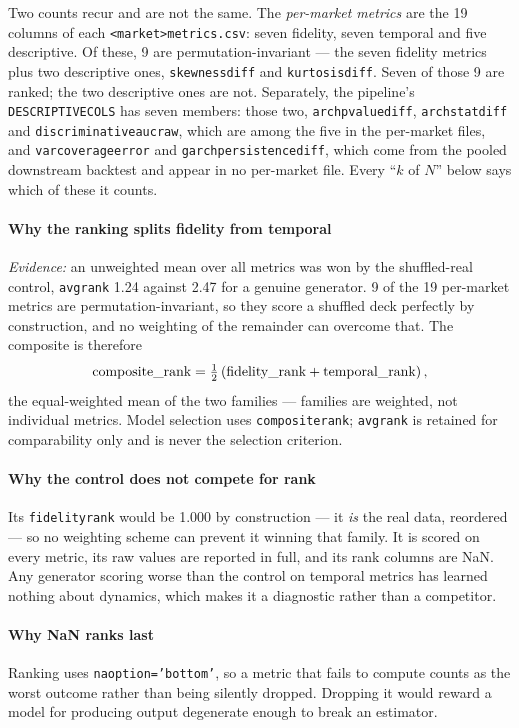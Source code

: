 \documentclass[11pt,a4paper]{article}
\makeatletter
\DeclareRobustCommand{\_}{\ifmmode\nfss@text{\textunderscore}\else\textunderscore\allowbreak\fi}
\makeatother
\begin{document}
Two counts recur and are not the same. The \emph{per-market metrics} are the 19 columns of each \texttt{<market>\_metrics.csv}: seven fidelity, seven temporal and five descriptive. Of these, 9 are permutation-invariant --- the seven fidelity metrics plus two descriptive ones, \texttt{skewness\_diff} and \texttt{kurtosis\_diff}. Seven of those 9 are ranked; the two descriptive ones are not. Separately, the pipeline's \texttt{DESCRIPTIVE\_COLS} has seven members: those two, \texttt{arch\_pvalue\_diff}, \texttt{arch\_stat\_diff} and \texttt{discriminative\_auc\_raw}, which are among the five in the per-market files, and \texttt{var\_coverage\_error} and \texttt{garch\_persistence\_diff}, which come from the pooled downstream backtest and appear in no per-market file. Every ``$k$ of $N$'' below says which of these it counts.

\paragraph{Why the ranking splits fidelity from temporal} \textit{Evidence:} an unweighted mean over all metrics was won by the shuffled-real control, \texttt{avg\_rank} 1.24 against 2.47 for a genuine generator. 9 of the 19 per-market metrics are permutation-invariant, so they score a shuffled deck perfectly by construction, and no weighting of the remainder can overcome that. The composite is therefore
\[ \text{composite\_rank} = \tfrac{1}{2}\left(\text{fidelity\_rank} + \text{temporal\_rank}\right), \]
the equal-weighted mean of the two families --- families are weighted, not individual metrics. Model selection uses \texttt{composite\_rank}; \texttt{avg\_rank} is retained for comparability only and is never the selection criterion.

\paragraph{Why the control does not compete for rank} Its \texttt{fidelity\_rank} would be 1.000 by construction --- it \emph{is} the real data, reordered --- so no weighting scheme can prevent it winning that family. It is scored on every metric, its raw values are reported in full, and its rank columns are NaN. Any generator scoring worse than the control on temporal metrics has learned nothing about dynamics, which makes it a diagnostic rather than a competitor.

\paragraph{Why NaN ranks last} Ranking uses \texttt{na\_option='bottom'}, so a metric that fails to compute counts as the worst outcome rather than being silently dropped. Dropping it would reward a model for producing output degenerate enough to break an estimator.
\end{document}
